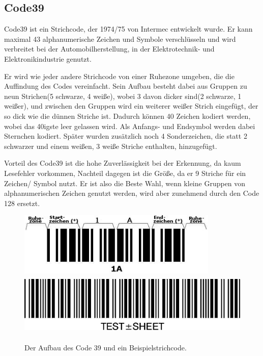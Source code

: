 \subsection*{Code39}
Code39 ist ein Strichcode, der 1974/75 von Intermec entwickelt wurde. Er kann maximal 43 alphanumerische Zeichen und Symbole verschlüsseln und wird verbreitet bei der Automobilherstellung, in der Elektrotechnik- und Elektronikindustrie genutzt.

Er wird wie jeder andere Strichcode von einer Ruhezone umgeben, die die Auffindung des Codes vereinfacht. Sein Aufbau besteht dabei aus Gruppen zu neun Strichen(5 schwarze, 4 weiße), wobei 3 davon dicker sind(2 schwarze, 1 weißer), und zwischen den Gruppen wird ein weiterer weißer Strich eingefügt, der so dick wie die dünnen Striche ist. Dadurch können 40 Zeichen kodiert werden, wobei das 40igste leer gelassen wird. Als Anfangs- und Endsymbol werden dabei Sternchen kodiert. Später wurden zusätzlich noch 4 Sonderzeichen, die statt 2 schwarzer und einem weißen, 3 weiße Striche enthalten, hinzugefügt.

Vorteil des Code39 ist die hohe Zuverlässigkeit bei der Erkennung, da kaum Lesefehler vorkommen, Nachteil dagegen ist die Größe, da er 9 Striche für ein Zeichen/ Symbol nutzt. Er ist also die Beste Wahl, wenn kleine Gruppen von alphanumerischen Zeichen genutzt werden, wird aber zunehmend durch den Code 128 ersetzt.

\begin{figure}[H]
  \centering
  \includegraphics[height=3cm]{img/EAN13/code39-structure.jpg}
  \includegraphics[height=3cm]{img/EAN13/code39.jpg}
  \caption{Der Aufbau des Code 39 und ein Beispielstrichcode.}
  \label{fig:code39}
\end{figure}

